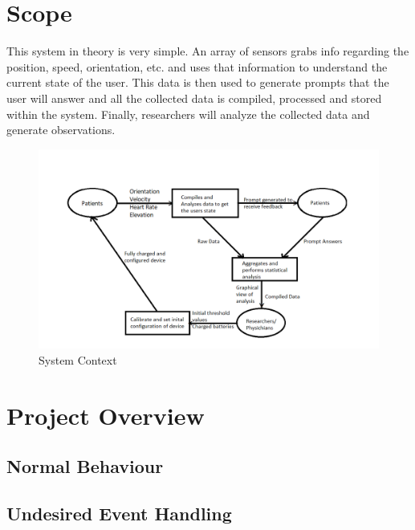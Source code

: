 \documentclass[12pt, titlepage]{article}
\begin{document}
\section{Scope}

This system in theory is very simple. An array of sensors grabs info regarding the position, speed, orientation, etc. and uses that information to understand the current state of the user. This data is then used to generate prompts that the user will answer and all the collected data is compiled, processed and stored within the system. Finally, researchers will analyze the collected data and generate observations. \\

\begin{figure}[H]

\begin{center}
 \includegraphics[width=.95\textwidth]{System Context Diagram}
\caption{System Context}
\label{Fig_SystemContext} 
\end{center}
\end{figure}


\section{Project Overview}

\subsection{Normal Behaviour}

\subsection{Undesired Event Handling}
\end{document}
